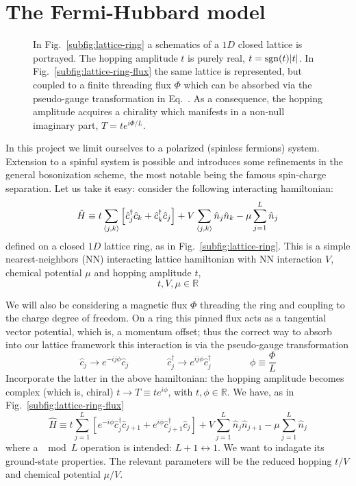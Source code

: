 \clearpage
\section{The Fermi-Hubbard model}

\begin{figure}
	\centering
	\hfil
	\caption{In Fig.~\ref{subfig:lattice-ring} a schematics of a $1D$ closed lattice is portrayed. The hopping amplitude $t$ is purely real, $t = \mathrm{sgn}(t) \abs{t}$. In Fig.~\ref{subfig:lattice-ring-flux} the same lattice is represented, but coupled to a finite threading flux $\Phi$ which can be absorbed via the pseudo-gauge transformation in Eq.~\todo. As a consequence, the hopping amplitude acquires a chirality which manifests in a non-null imaginary part, $T = t e^{i\Phi/L}$.}
	\label{fig:lattice-rings}
\end{figure}

In this project we limit ourselves to a polarized (spinless fermions) system. Extension to a spinful system is possible and introduces some refinements in the general bosonization scheme, the most notable being the famous spin-charge separation. Let us take it easy: consider the following interacting hamiltonian:
\begin{equation}\label{eq:spinless-hamiltonian-pbc}
	\hat H \equiv t \sum_{\ev{j,k}} \left[
		\hat c_j^\dagger \hat c_k + \hat c_k^\dagger \hat c_j 
	\right] + V \sum_{\ev{j,k}} \hat n_j \hat n_k - \mu \sum_{j=1}^L \hat n_j
\end{equation}
defined on a closed $1D$ lattice ring, as in Fig.~\ref{subfig:lattice-ring}.
This is a simple nearest-neighbors (NN) interacting lattice hamiltonian with NN interaction $V$, chemical potential $\mu$ and hopping amplitude $t$,
\[
	t, V, \mu \in \mathbb{R}
\]

We will also be considering a magnetic flux $\Phi$ threading the ring and coupling to the charge degree of freedom. On a ring this pinned flux acts as a tangential vector potential, which is, a momentum offset; thus the correct way to absorb into our lattice framework this interaction is via the pseudo-gauge transformation
\[
	\hat c_j \to e^{-ij \phi} \hat c_j
	\qquad\qquad
	\hat c_j^\dagger \to e^{ij \phi} \hat c_j^\dagger
	\qquad\qquad
	\phi \equiv \frac{\Phi}{L}
\]
Incorporate the latter in the above hamiltonian: the hopping amplitude becomes complex (which is, chiral) $t \to T \equiv t e^{i\phi}$, with $t, \phi \in \mathbb{R}$. We have, as in Fig.~\ref{subfig:lattice-ring-flux}
\begin{equation}\label{eq:spinless-hamiltonian-tbc}
	\hat H \equiv t \sum_{j=1}^L \left[ 
		e^{-i\phi} \hat c_j^\dagger \hat c_{j+1} + e^{i\phi} \hat c_{j+1}^\dagger \hat c_j 
	\right] + V \sum_{j=1}^L \hat n_j \hat n_{j+1} - \mu \sum_{j=1}^L \hat n_j
\end{equation}
where a $\mod L$ operation is intended: $L+1 \leftrightarrow 1$. We want to indagate its ground-state properties. The relevant parameters will be the reduced hopping $t/V$ and chemical potential $\mu/V$.

